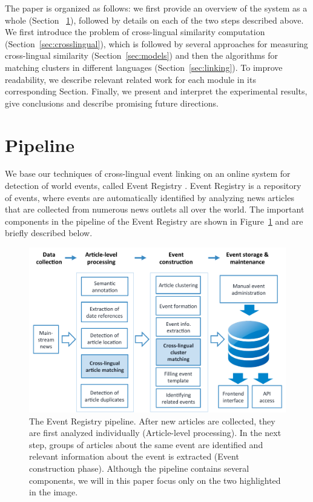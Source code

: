 \documentclass[twoside,11pt]{article}
\begin{document}
The paper is organized as follows: we first provide an overview of the system as a whole (Section ~\ref{sec:pipeline}), followed by details on each of the two steps described above. We first introduce the problem of cross-lingual similarity computation (Section~\ref{sec:crosslingual}), which is followed by several approaches for measuring cross-lingual similarity (Section~\ref{sec:models}) and then the algorithms for matching clusters in different languages (Section~\ref{sec:linking}).  To improve readability, we describe relevant related work for each module in its corresponding Section. Finally, we present and interpret the experimental results, give conclusions and describe promising future directions.


\section{Pipeline}\label{sec:pipeline}

We base our techniques of cross-lingual event linking on an online system for detection of world events, called Event Registry . Event Registry is a repository of events, where events are automatically identified by analyzing news articles that are collected from numerous news outlets all over the world. The important components in the pipeline of the Event Registry are shown in Figure~\ref{fig:erpipeline} and are briefly described below.

\begin{figure}[tbp]
\centering
\includegraphics[width=\textwidth]{pipeline}
\caption{\label{fig:erpipeline}  The Event Registry pipeline. After new articles are collected, they are first analyzed individually (Article-level processing). In the next step, groups of articles about the same event are identified and relevant information about the event is extracted (Event construction phase). Although the pipeline contains several components, we will in this paper focus only on the two highlighted in the image.}
\end{figure}
\end{document}
